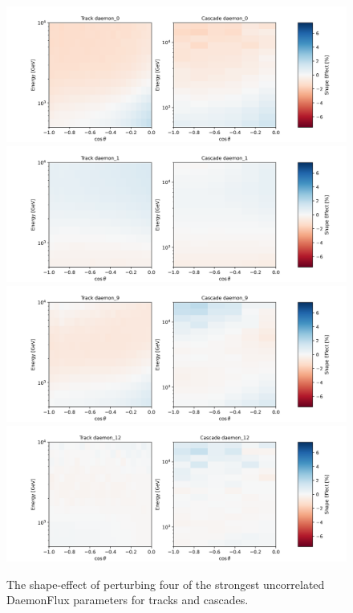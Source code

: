 \documentclass[main.tex]{subfiles}
\begin{document}

\begin{figure}
    \centering
    \includegraphics[width=0.45\linewidth]{figures/systematics/daemon_0.png}%
    \includegraphics[width=0.45\linewidth]{figures/systematics/daemon_1.png}\\
    \includegraphics[width=0.45\linewidth]{figures/systematics/daemon_9.png}%
    \includegraphics[width=0.45\linewidth]{figures/systematics/daemon_12.png}
    \caption{The shape-effect of perturbing four of the strongest uncorrelated DaemonFlux parameters for tracks and cascades.}\label{fig:daemon_analysis_one}
\end{figure}
\end{document}
